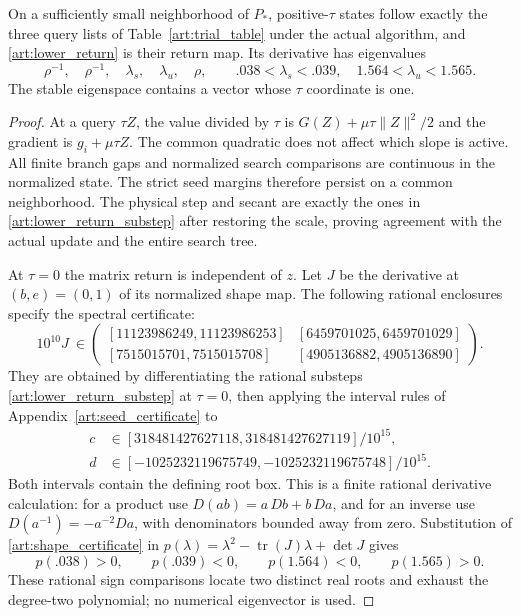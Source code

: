 \begin{lemma}\label{art:lower_hyperbolic}
On a sufficiently small neighborhood of $P_*$, positive-$\tau$ states
follow exactly the three query lists of Table~\ref{art:trial_table} under
the actual algorithm, and \eqref{art:lower_return} is their return map.
Its derivative has eigenvalues
\[
 \rho^{-1},\quad\rho^{-1},\quad\lambda_s,\quad\lambda_u,\quad\rho,
 \qquad .038<\lambda_s<.039,\quad1.564<\lambda_u<1.565.
\]
The stable eigenspace contains a vector whose $\tau$ coordinate is one.
\end{lemma}
\begin{proof}
At a query $\tau Z$, the value divided by $\tau$ is
$G(Z)+\mu\tau\|Z\|^2/2$ and the gradient is $g_i+\mu\tau Z$.
The common quadratic does not affect which slope is active. All finite
branch gaps and normalized search comparisons are continuous in the
normalized state. The strict seed margins therefore persist on a common
neighborhood. The physical step and secant are exactly the ones in
\eqref{art:lower_return_substep} after restoring the scale, proving
agreement with the actual update and the entire search tree.

At $\tau=0$ the matrix return is independent of $z$. Let $J$ be the
derivative at $(b,e)=(0,1)$ of its normalized shape map.
The following rational enclosures specify the spectral certificate:
\begin{equation}\label{art:shape_certificate}
 10^{10}J\ \in
 \begin{pmatrix}
 [11123986249,11123986253]&[6459701025,6459701029]\\
 [7515015701,7515015708]&[4905136882,4905136890]
 \end{pmatrix}.
\end{equation}
They are obtained by differentiating the rational substeps
\eqref{art:lower_return_substep} at $\tau=0$, then applying the interval
rules of Appendix~\ref{art:seed_certificate} to
\begin{align*}
 c&\in[318481427627118,318481427627119]/10^{15},\\
 d&\in[-1025232119675749,-1025232119675748]/10^{15}.
\end{align*}
Both intervals contain the defining root box. This is a finite rational
derivative calculation: for a product use
$D(ab)=a\,Db+b\,Da$, and for an inverse use
$D(a^{-1})=-a^{-2}Da$, with denominators bounded away from zero.
Substitution of \eqref{art:shape_certificate} in
$p(\lambda)=\lambda^2-\operatorname{tr}(J)\lambda+\det J$ gives
\[
 p(.038)>0,\qquad p(.039)<0,\qquad
 p(1.564)<0,\qquad p(1.565)>0.
\]
These rational sign comparisons locate two distinct real roots and exhaust
the degree-two polynomial; no numerical eigenvector is used.


\end{proof}
